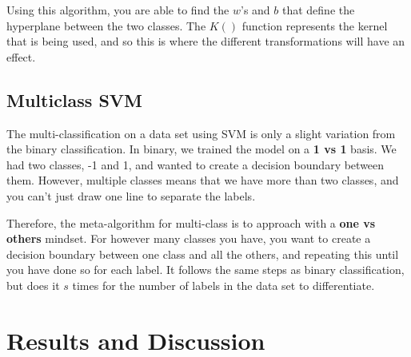 \documentclass[12pt]{article}
\begin{document}
Using this algorithm, you are able to find the $w$'s and $b$ that define the hyperplane between the two classes. The $K()$ function represents the kernel that is being used, and so this is where the different transformations will have an effect. 

\subsection{Multiclass SVM}
The multi-classification on a data set using SVM is only a slight variation from the binary classification. In binary, we trained the model on a \textbf{1 vs 1} basis. We had two classes, -1 and 1, and wanted to create a decision boundary between them. However, multiple classes means that we have more than two classes, and you can't just draw one line to separate the labels.

Therefore, the meta-algorithm for multi-class is to approach with a \textbf{one vs others} mindset. For however many classes you have, you want to create a decision boundary between one class and all the others, and repeating this until you have done so for each label. It follows the same steps as binary classification, but does it $s$ times for the number of labels in the data set to differentiate. 

\section{Results and Discussion}
\end{document}
